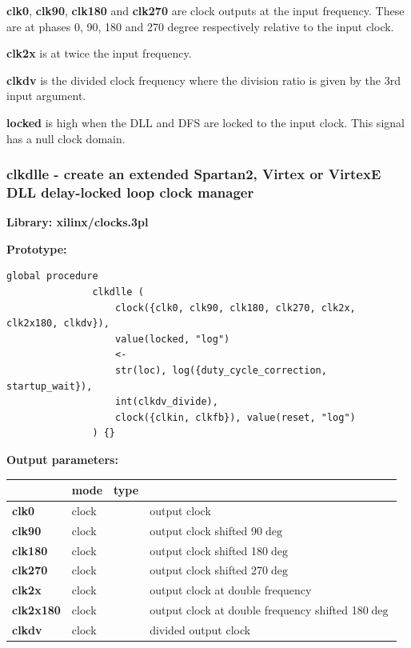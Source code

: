                 {\bf clk0}, {\bf clk90}, {\bf clk180} and {\bf clk270} are clock
                outputs at the input frequency. These are at phases 0, 90, 180 and 270
                degree respectively relative to the input clock.

                {\bf clk2x} is at twice the input frequency.

                {\bf clkdv} is the divided clock frequency where the division ratio
                is given by the 3rd input argument.

                {\bf locked} is high when the DLL and DFS are locked to the input
                clock. This signal has a null clock domain.






        \subsubsection{clkdlle - create an extended Spartan2, Virtex or VirtexE DLL delay-locked loop clock manager}\label{sec:lpclkdlle}
            
            {\bf Library: xilinx/clocks.3pl}

            {\bf Prototype:} \\
            \vsp
            \begin{lstlisting}[gobble=12, language=threepl]
               global procedure
               clkdlle (
                   clock({clk0, clk90, clk180, clk270, clk2x, clk2x180, clkdv}),
                   value(locked, "log")
                   <-
                   str(loc), log({duty_cycle_correction, startup_wait}),
                   int(clkdv_divide),
                   clock({clkin, clkfb}), value(reset, "log")
               ) {}
            \end{lstlisting}

            {\bf Output parameters:} \\
            \begin{tabular}{| l | l | l | l |}
            \hline
                           & mode  & type   & \\
            \hline \hline
            {\bf clk0}     & clock &        & output clock \\ \hline
            {\bf clk90}    & clock &        & output clock shifted 90$\deg$ \\ \hline
            {\bf clk180}   & clock &        & output clock shifted 180$\deg$ \\ \hline
            {\bf clk270}   & clock &        & output clock shifted 270$\deg$ \\ \hline
            {\bf clk2x}    & clock &        & output clock at double frequency \\ \hline
            {\bf clk2x180} & clock &        & output clock at double frequency shifted 180$\deg$ \\ \hline
            {\bf clkdv}    & clock &        & divided output clock \\ \hline
            \end{tabular}

